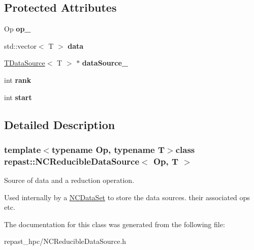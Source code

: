 \subsection*{Protected Attributes}
\begin{DoxyCompactItemize}
\item 
\hypertarget{classrepast_1_1_n_c_reducible_data_source_aa5cd25f8ad028a775dc7627c5c91587d}{Op {\bfseries op\-\_\-}}\label{classrepast_1_1_n_c_reducible_data_source_aa5cd25f8ad028a775dc7627c5c91587d}

\item 
\hypertarget{classrepast_1_1_n_c_reducible_data_source_a9685203ae48080b54fa0203e891b54ae}{std\-::vector$<$ T $>$ {\bfseries data}}\label{classrepast_1_1_n_c_reducible_data_source_a9685203ae48080b54fa0203e891b54ae}

\item 
\hypertarget{classrepast_1_1_n_c_reducible_data_source_a5b8b75d2e197c52368b4ccc81f71ed90}{\hyperlink{classrepast_1_1_t_data_source}{T\-Data\-Source}$<$ T $>$ $\ast$ {\bfseries data\-Source\-\_\-}}\label{classrepast_1_1_n_c_reducible_data_source_a5b8b75d2e197c52368b4ccc81f71ed90}

\item 
\hypertarget{classrepast_1_1_n_c_reducible_data_source_a02d3aaeda5a9d70dc599da7b01401668}{int {\bfseries rank}}\label{classrepast_1_1_n_c_reducible_data_source_a02d3aaeda5a9d70dc599da7b01401668}

\item 
\hypertarget{classrepast_1_1_n_c_reducible_data_source_a4a94e07fac10264e228eef6a6f25de83}{int {\bfseries start}}\label{classrepast_1_1_n_c_reducible_data_source_a4a94e07fac10264e228eef6a6f25de83}

\end{DoxyCompactItemize}


\subsection{Detailed Description}
\subsubsection*{template$<$typename Op, typename T$>$class repast\-::\-N\-C\-Reducible\-Data\-Source$<$ Op, T $>$}

Source of data and a reduction operation. 

Used internally by a \hyperlink{classrepast_1_1_n_c_data_set}{N\-C\-Data\-Set} to store the data sources. their associated ops etc. 

The documentation for this class was generated from the following file\-:\begin{DoxyCompactItemize}
\item 
repast\-\_\-hpc/N\-C\-Reducible\-Data\-Source.\-h\end{DoxyCompactItemize}
